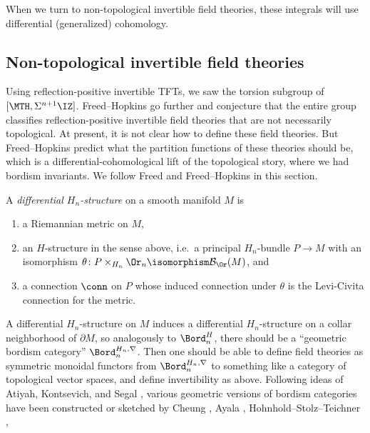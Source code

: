 When we turn to non-topological invertible field theories, these integrals will use differential (generalized)
cohomology.
\subsection{Non-topological invertible field theories}
\label{non_top_field_theory}
Using reflection-positive invertible TFTs, we saw the torsion subgroup of $[\MTH, \Sigma^{n+1}\IZ]$.
Freed--Hopkins \cite[\S 5.4]{FH21} go further and conjecture that the entire group classifies reflection-positive
invertible field theories that are not necessarily topological. At present, it is not clear how to define these
field theories. But Freed--Hopkins predict what the partition functions of these theories should be, which is a
differential-cohomological lift of the topological story, where we had bordism invariants. We follow
Freed \cite[Lecture 9]{Fre19} and Freed--Hopkins \cite[\S 5.4]{FH21} in this section.
\begin{defn}
A \textit{differential $H_n$-structure} on a smooth manifold $M$ is
\begin{enumerate}[(1)]
	\item a Riemannian metric on $M$,
	\item an $H$-structure in the sense above, i.e.\ a principal $H_n$-bundle $P\to M$ with an isomorphism
	$\theta\colon P\times_{H_n}\Or_n\isomorphism\mathcal B_{\Or}(M)$, and
	\item a connection $\conn$ on $P$ whose induced connection under $\theta$ is the Levi-Civita connection for
	the metric.
\end{enumerate}
\end{defn}
A differential $H_n$-structure on $M$ induces a differential $H_n$-structure on a collar neighborhood of $\partial
M$, so analogously to $\Bord_n^H$, there should be a ``geometric bordism category'' $\Bord_n^{H_n, \nabla}$. Then
one should be able to define field theories as symmetric monoidal functors from $\Bord_n^{H_n, \nabla}$ to
something like a category of topological vector spaces, and define invertibility as above.
Following ideas of Atiyah, Kontsevich, and Segal \cite{Seg11}, various geometric versions of bordism categories
have been constructed or sketched by
Cheung \cite{Che07},
Ayala \cite{Aya09},
Hohnhold--Stolz--Teichner \cite[\S 6.2]{HST10},
